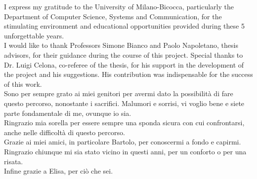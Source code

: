 \documentclass[corpo=11pt,english,numerazioneromana]{toptesi}
\begin{document}






\tableofcontents




\mainmatter






\appendix






\printbibliography[type=article,title={Bibliography}, heading=bibintoc]
\printbibliography[type=online,title={Web references}, heading=bibintoc]



\ringraziamenti
{}
I express my gratitude to the University of Milano-Bicocca, particularly the Department of Computer Science, Systems and Communication, for the stimulating environment and educational opportunities provided during these 5 unforgettable years.\\

\noindent
I would like to thank Professors Simone Bianco and Paolo Napoletano, thesis advisors, for their guidance during the course of this project. Special thanks to Dr. Luigi Celona, co-referee of the thesis, for his support in the development of the project and his suggestions. His contribution was indispensable for the success of this work.\\

\noindent
Sono per sempre grato ai miei genitori per avermi dato la possibilità di fare questo percorso, nonostante i sacrifici. Malumori e sorrisi, vi voglio bene e siete parte fondamentale di me, ovunque io sia.\\

\noindent
Ringrazio mia sorella per essere sempre una sponda sicura con cui confrontarsi, anche nelle difficoltà di questo percorso.\\

\noindent
Grazie ai miei amici, in particolare Bartolo, per conoscermi a fondo e capirmi. Ringrazio chiunque mi sia stato vicino in questi anni, per un conforto o per una risata. \\

\noindent
Infine grazie a Elisa, per ciò che sei.





\end{document}
